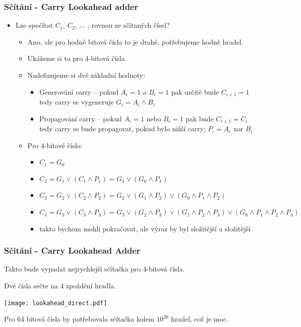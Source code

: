 \documentclass{beamer}
\begin{document}
\begin{frame}
\frametitle{Sčítání - Carry Lookahead adder}

\begin{itemize}
\item Lze spočítat $C_1$, $C_2$, ... , rovnou ze sčítaných čísel?
\begin{itemize}
\item Ano, ale pro hodně bitová čísla to je drahé, potřebujeme hodně hradel.
\item Ukážeme si to pro 4-bitová čísla
\item Nadefinujeme si dvě základní hodnoty:
\begin{itemize}
\item Generování carry -- pokud $A_i=1$ a $B_i=1$ pak určitě bude $C_{i+1}=1$ tedy carry se vygeneruje $G_i=A_i \land B_i$ 
\item Propagování carry -- pokud $A_i=1$ nebo $B_i=1$ pak bude $C_{i+1}=C_{i}$ tedy carry se bude propagovat, pokud bylo nižší carry; $P_i=A_i$ xor $B_i$ 
\end{itemize}
\item Pro 4-bitové číslo:
\begin{itemize}
\item $C_1=G_0$ 
\item $C_2=G_1 \lor (C_1 \land P_1)= G_1 \lor (G_0 \land P_1)$
\item $C_3=G_2 \lor (C_2 \land P_2)= G_2 \lor (G_1 \land P_2) \lor (G_0 \land P_1 \land P_2)$ 
\item $C_4=G_3 \lor (C_3 \land P_3)= G_3 \lor (G_2 \land P_3) \lor (G_1 \land P_2 \land P_3) \lor (G_0 \land P_1 \land P_2 \land P_3)$
\item takto bychom mohli pokračovat, ale výraz by byl složitější a složitější
\end{itemize}
\end{itemize}
\end{itemize}

\end{frame}

\begin{frame}
\frametitle{Sčítání - Carry Lookahead Adder}

Takto bude vypadat nejrychlejší sčítačka pro 4-bitová čísla. 

Dvě čísla sečte na 4 zpoždění hradla.
\begin{center}
   \texttt{[image: lookahead\_direct.pdf]}
\end{center}

Pro 64 bitová čísla by potřebovala sčítačka kolem $10^{20}$ hradel, což je moc.
\end{frame}
\end{document}
